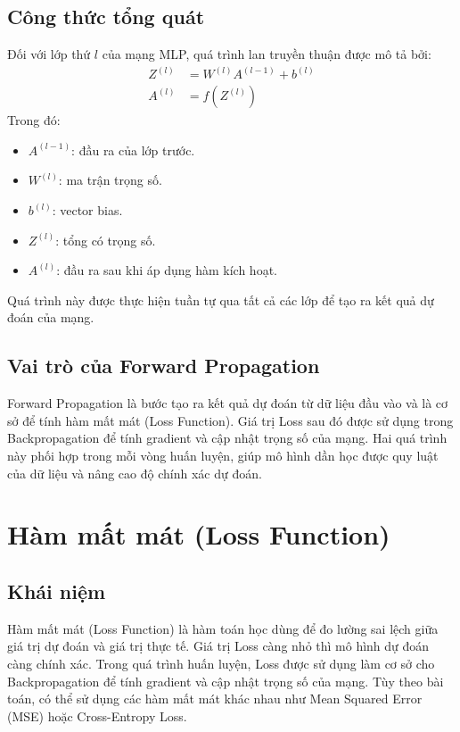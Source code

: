\documentclass[12pt,a4paper]{report}
\begin{document}
\subsection{Công thức tổng quát}
Đối với lớp thứ $l$ của mạng MLP, quá trình lan truyền thuận được mô tả bởi:
\begin{align}
    Z^{(l)} &= W^{(l)} A^{(l-1)} + b^{(l)} \\
    A^{(l)} &= f\left(Z^{(l)}\right)
\end{align}
Trong đó:
\begin{itemize}
    \item $A^{(l-1)}$: đầu ra của lớp trước.
    \item $W^{(l)}$: ma trận trọng số.
    \item $b^{(l)}$: vector bias.
    \item $Z^{(l)}$: tổng có trọng số.
    \item $A^{(l)}$: đầu ra sau khi áp dụng hàm kích hoạt.
\end{itemize}
Quá trình này được thực hiện tuần tự qua tất cả các lớp để tạo ra kết quả dự đoán của mạng.

\subsection{Vai trò của Forward Propagation}
Forward Propagation là bước tạo ra kết quả dự đoán từ dữ liệu đầu vào và là cơ sở để tính hàm mất mát (Loss Function). Giá trị Loss sau đó được sử dụng trong Backpropagation để tính gradient và cập nhật trọng số của mạng. Hai quá trình này phối hợp trong mỗi vòng huấn luyện, giúp mô hình dần học được quy luật của dữ liệu và nâng cao độ chính xác dự đoán.

\section{Hàm mất mát (Loss Function)}
\subsection{Khái niệm}
Hàm mất mát (Loss Function) là hàm toán học dùng để đo lường sai lệch giữa giá trị dự đoán và giá trị thực tế. Giá trị Loss càng nhỏ thì mô hình dự đoán càng chính xác. Trong quá trình huấn luyện, Loss được sử dụng làm cơ sở cho Backpropagation để tính gradient và cập nhật trọng số của mạng. Tùy theo bài toán, có thể sử dụng các hàm mất mát khác nhau như Mean Squared Error (MSE) hoặc Cross-Entropy Loss.
\end{document}
